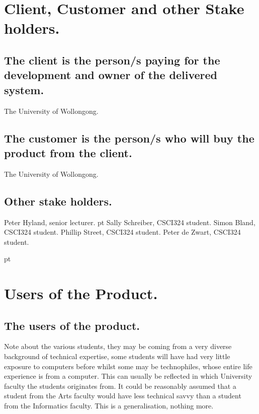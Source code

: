 \section{Client, Customer and other Stake holders.}

\subsection{The client is the person/s paying for the development and owner of the delivered system.}

The University of Wollongong.

\subsection{The customer is the person/s who will buy the product from the client.}

The University of Wollongong.

\subsection{Other stake holders.}


\items Peter Hyland, senior lecturer.
 pt
\items Sally Schreiber, CSCI324 student.
\items Simon Bland, CSCI324 student.
\items Phillip Street, CSCI324 student.
\items Peter de Zwart, CSCI324 student.

 pt

\section{Users of the Product.}

\subsection{The users of the product.}

Note about the various students, they may be coming from a very diverse background of technical expertise, some students will have had very little exposure to computers before whilst some may be technophiles, whose entire life experience is from a computer. This can usually be reflected in which University faculty the students originates from. It could be reasonably assumed that a student from the Arts faculty would have less technical
savvy than a student from the Informatics faculty. This is a generalisation, nothing more.

